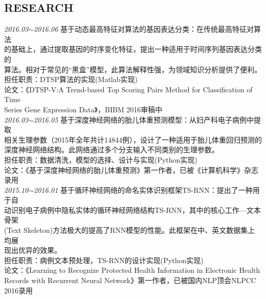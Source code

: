 \documentclass[line, margin]{res}
\newcommand{\xiaowu}{\fontsize{9pt}{15.75pt}\selectfont} %
\begin{document}
\begin{resume}
\section{RESEARCH}
 {
 {\sl 2016.03$\sim$2016.06} 基于动态最高特征对算法的基因表达分类：{ 在传统最高特征对算法\\
 的基础上，通过提取基因的时序变化特征，提出一种适用于时间序列基因表达分类的\\
 算法。相对于常见的“黑盒”模型，此算法解释性强，为领域知识分析提供了便利。}\\
 {\xiaowu 担任职责：DTSP算法的实现(Matlab实现)}\\
 {\xiaowu 论文：《DTSP-V:A Trend-based Top Scoring Pairs Method for Classification of Time\\
  Series Gene Expression Data》，BIBM 2016审稿中}\\
[9pt]
 {\sl 2016.03$\sim$2016.05} 基于深度神经网络的胎儿体重预测模型：{ 从妇产科电子病例中提取\\
 相关生理参数（2015年全年共计14844例），设计了一种适用于胎儿体重回归预测的\\
 深度神经网络结构。此网络通过多个分支输入不同类别的生理参数。} \\
 {\xiaowu 担任职责：数据清洗，模型的选择、设计与实现(Python实现)}\\
 {\xiaowu 论文：《基于深度神经网络的胎儿体重预测》第一作者，已被《计算机科学》杂志录用} \\
[9pt]
 {\sl 2015.10$\sim$2016.01} 基于循环神经网络的命名实体识别框架TS-RNN：{ 提出了一种用于自\\
 动识别电子病例中隐私实体的循环神经网络结构TS-RNN，其中的核心工作—文本骨架\\
 (Text Skeleton)方法极大的提高了RNN模型的性能。此框架在中、英文数据集上均展\\
 现出优异的效果。} \\
 {\xiaowu 担任职责：病例文本预处理，TS-RNN的设计实现(Python实现)}\\
 {\xiaowu 论文：《Learning to Recognize Protected Health Information in  Electronic Health\\
 Records with Recurrent Neural Network》第一作者，已被国内NLP顶会NLPCC 2016录用}\\
 }


\end{resume}
\end{document}
